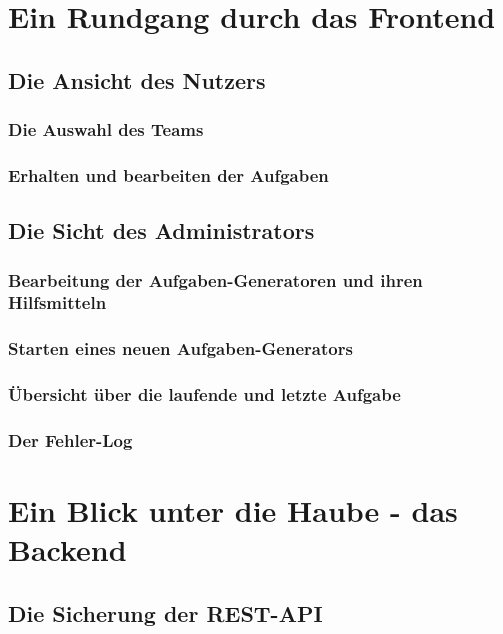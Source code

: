 \chapter{Ein Rundgang durch das Frontend}





\section{Die Ansicht des Nutzers}


\subsection{Die Auswahl des Teams}

\subsection{Erhalten und bearbeiten der Aufgaben}



\section{Die Sicht des Administrators}
\subsection{Bearbeitung der Aufgaben-Generatoren und ihren Hilfsmitteln}
\subsection{Starten eines neuen Aufgaben-Generators}
\subsection{Übersicht über die laufende und letzte Aufgabe}
\subsection{Der Fehler-Log}




\chapter{Ein Blick unter die Haube - das Backend}

\section{Die Sicherung der REST-API}

